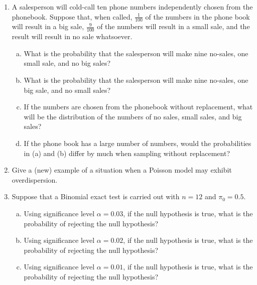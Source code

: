 \documentclass[10pt, oneside]{article}
\begin{document}
\begin{enumerate}
\item A salesperson will cold-call ten phone numbers independently chosen from the phonebook. Suppose that, when called, $\frac{1}{100}$ of the numbers in the phone book will result in a big sale, $\frac{9}{100}$ of the numbers will result in a small sale, and the result will result in no sale whatsoever. 
\begin{enumerate}[(a)]
\item What is the probability that the salesperson will make nine no-sales, one small sale, and no big sales?
\item What is the probability that the salesperson will make nine no-sales, one big sale, and no small sales?
\item If the numbers are chosen from the phonebook without replacement, what will be the distribution of the numbers of no sales, small sales, and big sales?
\item If the phone book has a large number of numbers, would the probabilities in (a) and (b) differ by much when sampling without replacement? 
\end{enumerate}
\item Give a (new) example of a situation when a Poisson model may exhibit overdispersion.
\item Suppose that a Binomial exact test is carried out with $n=12$ and $\pi_0=0.5$.
\begin{enumerate}[(a)]
\item Using significance level $\alpha = 0.03$, if the null hypothesis is true, what is the probability of rejecting the null hypothesis?
\item Using significance level $\alpha = 0.02$, if the null hypothesis is true, what is the probability of rejecting the null hypothesis?
\item Using significance level $\alpha = 0.01$, if the null hypothesis is true, what is the probability of rejecting the null hypothesis?
\end{enumerate}

  

\end{enumerate}
\end{document}
